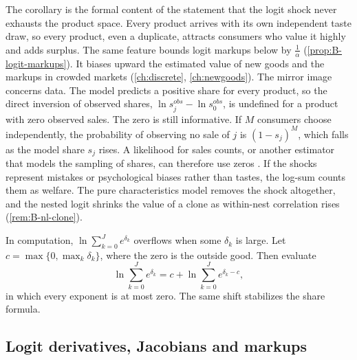 The corollary is the formal content of the statement that the logit shock never exhausts the product
space. Every product arrives with its own independent taste draw, so every product, even a duplicate,
attracts consumers who value it highly and adds surplus. The same feature bounds logit markups below by
$\frac{1}{\alpha}$ (\cref{prop:B-logit-markups}). It biases upward the estimated value of new goods and the
markups in crowded markets (\cref{ch:discrete}, \cref{ch:newgoods}). The mirror image concerns data. The model
predicts a positive share for every product, so the direct inversion of observed shares, $\ln s_j^{obs} - \ln s_0^{obs}$, is
undefined for a product with zero observed sales. The zero is still informative. If $M$ consumers choose
independently, the probability of observing no sale of $j$ is $(1 - s_j)^M$, which falls as the model share
$s_j$ rises. A likelihood for sales counts, or another estimator that models the sampling of shares, can
therefore use zeros \citep{GandhiLuShi2023}. If the shocks represent mistakes or
psychological biases rather than tastes, the log-sum counts them as welfare. The pure characteristics model
removes the shock altogether, and the nested logit shrinks the value of a clone as within-nest correlation
rises (\cref{rem:B-nl-clone}).

In computation, $\ln\sum_{k = 0}^Je^{\delta_k}$ overflows when some $\delta_k$ is large. Let
$c = \max\{0, \max_k\delta_k\}$, where the zero is the outside good. Then evaluate
\begin{equation}\label{eq:B-logsumexp}
\ln\sum_{k = 0}^Je^{\delta_k} = c + \ln\sum_{k = 0}^Je^{\delta_k - c},
\end{equation}
in which every exponent is at most zero. The same shift stabilizes the share formula.

\subsection{Logit derivatives, Jacobians and markups}\label{sec:B-logit-algebra}

